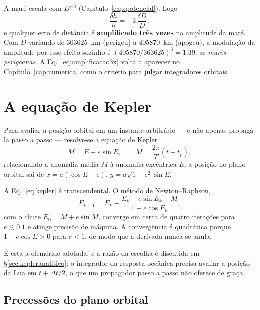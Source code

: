 \documentclass[11pt,a4paper,oneside]{report}
\theoremstyle{definition}
\theoremstyle{plain}
\theoremstyle{remark}
\begin{document}
\begin{caixa}
A maré escala com $D^{-3}$ (Capítulo~\ref{cap:potencial}). Logo
\begin{equation}
\frac{\delta h}{h} = -3\,\frac{\delta D}{D},
\label{eq:amplificacao3x}
\end{equation}
e qualquer erro de distância é \textbf{amplificado três vezes} na amplitude da
maré. Com $D$ variando de \SI{363625}{\kilo\meter} (perigeu) a
\SI{405870}{\kilo\meter} (apogeu), a modulação da amplitude por esse efeito
sozinho é $(405870/363625)^3=\num{1.39}$: as \emph{marés perigeanas}. A
Eq.~\eqref{eq:amplificacao3x} volta a aparecer no Capítulo~\ref{cap:numerica}
como o critério para julgar integradores orbitais.
\end{caixa}

\section{A equação de Kepler}
\label{sec:kepler_eq}

Para avaliar a posição orbital em um instante arbitrário — e não apenas
propagá-la passo a passo — resolve-se a equação de Kepler
\begin{equation}
M = E - e\sin E, \qquad M=\frac{2\pi}{T}(t-t_p),
\label{eq:kepler}
\end{equation}
relacionando a anomalia média $M$ à anomalia excêntrica $E$; a posição no plano
orbital sai de $x=a(\cos E-e)$, $y=a\sqrt{1-e^{2}}\sin E$.

A Eq.~\eqref{eq:kepler} é transcendental. O método de Newton--Raphson,
\begin{equation}
E_{k+1}=E_k-\frac{E_k-e\sin E_k-M}{1-e\cos E_k},
\end{equation}
com o chute $E_0=M+e\sin M$, converge em cerca de quatro iterações para
$e\lesssim 0.1$ e atinge precisão de máquina. A convergência é quadrática
porque $1-e\cos E>0$ para $e<1$, de modo que a derivada nunca se anula.

É esta a efeméride adotada, e a razão da escolha é discutida em
\S\ref{sec:kepleranalitico}: o integrador da
resposta oceânica precisa avaliar a posição da Lua em $t+\Delta t/2$, o que um
propagador passo a passo não oferece de graça.

\subsection{Precessões do plano orbital}
\end{document}
